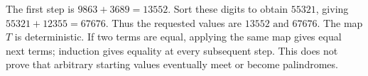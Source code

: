 The first step is $9863+3689=13552$. Sort these digits to obtain $55321$, giving $55321+12355=67676$. Thus the requested values are $\boxed{13552\text{ and }67676}$. The map $T$ is deterministic. If two terms are equal, applying the same map gives equal next terms; induction gives equality at every subsequent step. This does not prove that arbitrary starting values eventually meet or become palindromes.
